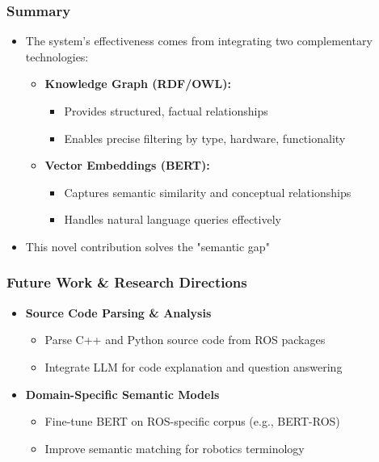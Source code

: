 \documentclass{beamer}
\begin{document}
\begin{frame} 
  \frametitle{Summary }
  \begin{itemize}
    \item The system's effectiveness comes from integrating two complementary technologies:
        \begin{itemize}
            \item \textbf{Knowledge Graph (RDF/OWL):}
            \begin{itemize}
                \item Provides structured, factual relationships
                \item Enables precise filtering by type, hardware, functionality
            \end{itemize}
            \item \textbf{Vector Embeddings (BERT):}
            \begin{itemize}
                \item Captures semantic similarity and conceptual relationships
                \item Handles natural language queries effectively
            \end{itemize}
        \end{itemize}
 
    \item This novel contribution solves the "semantic gap"
  \end{itemize}
\end{frame}

\begin{frame} 
  \frametitle{Future Work \& Research Directions}
  \begin{itemize}
    \item \textbf{Source Code Parsing \& Analysis}
    \begin{itemize}
        \item Parse C++ and Python source code from ROS packages
        \item Integrate LLM for code explanation and question answering
    \end{itemize}

    \item \textbf{Domain-Specific Semantic Models}
    \begin{itemize}
        \item Fine-tune BERT on ROS-specific corpus (e.g., BERT-ROS)
        \item Improve semantic matching for robotics terminology
    \end{itemize}
  \end{itemize}
\end{frame}
\end{document}
